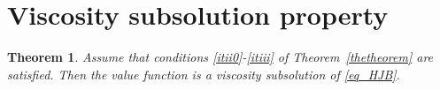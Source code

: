 \documentclass{article}
\newtheorem{theorem}{Theorem}[section]
\theoremstyle{definition}
\newtheorem{remark}[theorem]{\textbf{Remark}}
\numberwithin{equation}{section}
\numberwithin{theorem}{section}
\newcommand{\R}{\mathbb{R}}
\newcommand{\dx}{\mathrm{d}x}
\newcommand{\dy}{\mathrm{d}y}
\newcommand{\Hb}{\mathbb{H}}
\renewcommand{\r}{R}
\newcommand{\Pcal}{{\mathcal P}}
\begin{document}
%
%
%
%
%
%
%
%










\section{Viscosity subsolution property}
\label{sec:visc-subs-prop}

\begin{theorem}\label{thm2}
Assume that conditions \ref{itii0}-\ref{itiii} of Theorem~\ref{thetheorem} are satisfied. Then the value function is a viscosity subsolution of \eqref{eq_HJB}.
%
\end{theorem}
\end{document}
